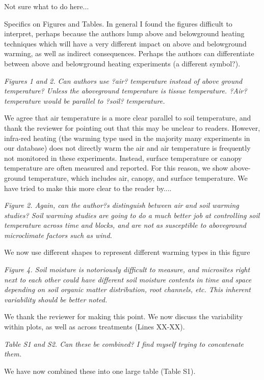 \documentclass[11pt,a4paper]{letter}
\begin{document}
\begin{letter}{}
\par Not sure what to do here...

Specifics on Figures and Tables.
In general I found the figures difficult to interpret, perhaps because the authors lump above and belowground heating techniques which will have a very different impact on above and belowground warming, as well as indirect consequences.  Perhaps the authors can differentiate between above and belowground heating experiments (a different symbol?).

\par \emph{Figures 1 and 2. Can authors use ?air? temperature instead of above ground temperature? Unless the aboveground temperature is tissue temperature.  ?Air? temperature would be parallel to ?soil? temperature. }
\par We agree that air temperature is a more clear parallel to soil temperature, and thank the reviewer for pointing out that this may be unclear to readers. However, infra-red heating (the warming type used in the majority many experiments in our database)  does not directly warm the air and air temperature is frequently not monitored in these experiments. Instead, surface temperature or canopy temperature are often measured and reported. For this reason, we show above-ground temperature, which includes air, canopy, and surface temperature. We have tried to make this more clear to the reader by....

\par \emph{Figure 2.  Again, can the author?s distinguish between air and soil warming studies?  Soil warming studies are going to do a much better job at controlling soil temperature across time and blocks, and are not as susceptible to aboveground microclimate factors such as wind.}
\par We now use different shapes to represent different warming types in this figure

\par \emph{Figure 4.  Soil moisture is notoriously difficult to measure, and microsites right next to each other could have different soil moisture contents in time and space depending on soil organic matter distribution, root channels, etc.  This inherent variability should be better noted.}
\par We thank the reviewer for making this point. We now discuss the variability within plots, as well as across treatments (Lines XX-XX).

\par \emph{Table S1 and S2.  Can these be combined?  I find myself trying to concatenate them.}
\par We have now combined these into one large table (Table S1).


\end{letter}
\end{document}
